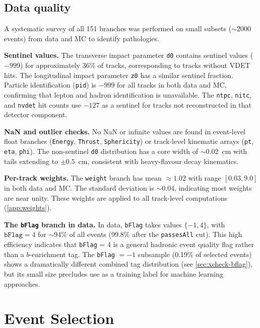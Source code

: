 \documentclass[11pt,a4paper]{article}
\begin{document}
\subsection{Data quality}
\label{sec:data:quality}

A systematic survey of all 151 branches was performed on small
subsets ($\sim$2000 events) from data and MC to identify
pathologies.

\textbf{Sentinel values.}
The transverse impact parameter \texttt{d0} contains sentinel
values ($-999$) for approximately 36\% of tracks, corresponding
to tracks without VDET hits.
The longitudinal impact parameter \texttt{z0} has a similar
sentinel fraction.
Particle identification (\texttt{pid}) is $-999$ for all tracks
in both data and MC, confirming that lepton and hadron
identification is unavailable.
The \texttt{ntpc}, \texttt{nitc}, and \texttt{nvdet} hit counts
use $-127$ as a sentinel for tracks not reconstructed in that
detector component.

\textbf{NaN and outlier checks.}
No NaN or infinite values are found in event-level float branches
(\texttt{Energy}, \texttt{Thrust}, \texttt{Sphericity}) or
track-level kinematic arrays (\texttt{pt}, \texttt{eta},
\texttt{phi}).
The non-sentinel \texttt{d0} distribution has a core width of
$\sim$0.02~cm with tails extending to $\pm 0.5$~cm, consistent
with heavy-flavour decay kinematics.

\textbf{Per-track weights.}
The \texttt{weight} branch has mean $\approx 1.02$ with range
$[0.03, 9.0]$ in both data and MC.
The standard deviation is $\sim$0.04, indicating most weights are
near unity.
These weights are applied to all track-level computations
(\cref{app:weights}).

\textbf{The \texttt{bFlag} branch in data.}
In data, \texttt{bFlag} takes values $\{-1, 4\}$, with
$\texttt{bFlag} = 4$ for $\sim$94\% of all events (99.8\% after
the \texttt{passesAll} cut).
This high efficiency indicates that \texttt{bFlag} = 4 is a
general hadronic event quality flag rather than a $b$-enrichment
tag.
The \texttt{bFlag} $= -1$ subsample (0.19\% of selected events)
shows a dramatically different combined tag distribution
(see \cref{sec:xcheck-bflag}), but its small size precludes
use as a training label for machine learning approaches.

\section{Event Selection}
\label{sec:selection}
\end{document}

